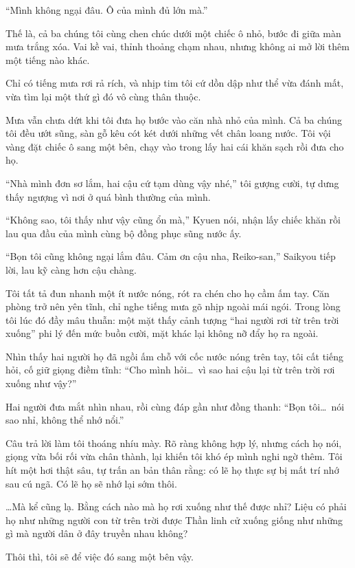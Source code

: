 \documentclass[../main.tex]{subfiles}
\begin{document}
``Mình không ngại đâu. Ô của mình đủ lớn mà.''

Thế là, cả ba chúng tôi cùng chen chúc dưới một chiếc ô nhỏ, bước đi giữa màn mưa trắng xóa. Vai kề vai, thỉnh thoảng chạm nhau, nhưng không ai mở lời thêm một tiếng nào khác.

Chỉ có tiếng mưa rơi rả rích, và nhịp tim tôi cứ dồn dập như thể vừa đánh mất, vừa tìm lại một thứ gì đó vô cùng thân thuộc.

\ct

Mưa vẫn chưa dứt khi tôi đưa họ bước vào căn nhà nhỏ của mình. Cả ba chúng tôi đều ướt sũng, sàn gỗ kêu cót két dưới những vết chân loang nước. Tôi vội vàng đặt chiếc ô sang một bên, chạy vào trong lấy hai cái khăn sạch rồi đưa cho họ.

``Nhà mình đơn sơ lắm, hai cậu cứ tạm dùng vậy nhé,'' tôi gượng cười, tự dưng thấy ngượng vì nơi ở quá bình thường của mình.

``Không sao, tôi thấy như vậy cũng ổn mà,'' Kyuen nói, nhận lấy chiếc khăn rồi lau qua đầu của mình cùng bộ đồng phục sũng nước ấy.

``Bọn tôi cũng không ngại lắm đâu. Cảm ơn cậu nha, Reiko-san,'' Saikyou tiếp lời, lau kỹ càng hơn cậu chàng.

Tôi tất tả đun nhanh một ít nước nóng, rót ra chén cho họ cầm ấm tay. Căn phòng trở nên yên tĩnh, chỉ nghe tiếng mưa gõ nhịp ngoài mái ngói. Trong lòng tôi lúc đó đầy mâu thuẫn: một mặt thấy cảnh tượng ``hai người rơi từ trên trời xuống'' phi lý đến mức buồn cười, mặt khác lại không nỡ đẩy họ ra ngoài.

Nhìn thấy hai người họ đã ngồi ấm chỗ với cốc nước nóng trên tay, tôi cất tiếng hỏi, cố giữ giọng điềm tĩnh: ``Cho mình hỏi\dots\ vì sao hai cậu lại từ trên trời rơi xuống như vậy?''

Hai người đưa mắt nhìn nhau, rồi cùng đáp gần như đồng thanh: ``Bọn tôi\dots\ nói sao nhỉ, không thể nhớ nổi.''

Câu trả lời làm tôi thoáng nhíu mày. Rõ ràng không hợp lý, nhưng cách họ nói, giọng vừa bối rối vừa chân thành, lại khiến tôi khó ép mình nghi ngờ thêm. Tôi hít một hơi thật sâu, tự trấn an bản thân rằng: có lẽ họ thực sự bị mất trí nhớ sau cú ngã. Có lẽ họ sẽ nhớ lại sớm thôi.

\dots Mà kể cũng lạ. Bằng cách nào mà họ rơi xuống như thế được nhỉ? Liệu có phải họ như những người con từ trên trời được Thần linh cử xuống giống như những gì mà người dân ở đây truyền nhau không?

Thôi thì, tôi sẽ để việc đó sang một bên vậy.
\end{document}
